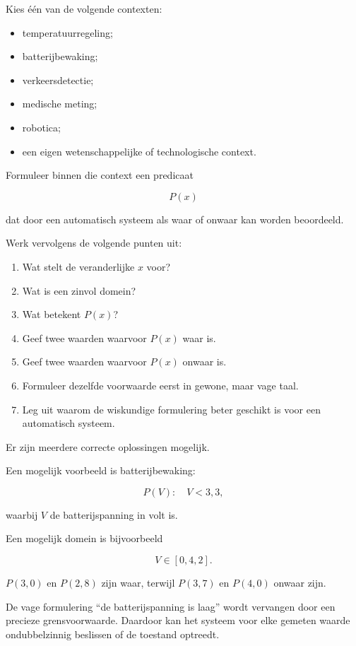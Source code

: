 \documentclass{ximera}
\begin{document}
\begin{oefening}{\oefG}

Kies één van de volgende contexten:

\begin{itemize}
  \item temperatuurregeling;
  \item batterijbewaking;
  \item verkeersdetectie;
  \item medische meting;
  \item robotica;
  \item een eigen wetenschappelijke of technologische context.
\end{itemize}

Formuleer binnen die context een predicaat

\[
P(x)
\]

dat door een automatisch systeem als waar of onwaar kan worden
beoordeeld.

Werk vervolgens de volgende punten uit:

\begin{enumerate}
  \item Wat stelt de veranderlijke $x$ voor?
  \item Wat is een zinvol domein?
  \item Wat betekent $P(x)$?
  \item Geef twee waarden waarvoor $P(x)$ waar is.
  \item Geef twee waarden waarvoor $P(x)$ onwaar is.
  \item Formuleer dezelfde voorwaarde eerst in gewone, maar vage taal.
  \item Leg uit waarom de wiskundige formulering beter geschikt is voor
        een automatisch systeem.
\end{enumerate}

\begin{oplossing}
Er zijn meerdere correcte oplossingen mogelijk.

Een mogelijk voorbeeld is batterijbewaking:

\[
P(V):\quad V<3{,}3,
\]

waarbij $V$ de batterijspanning in volt is.

Een mogelijk domein is bijvoorbeeld

\[
V\in[0,4{,}2].
\]

$P(3{,}0)$ en $P(2{,}8)$ zijn waar, terwijl $P(3{,}7)$ en $P(4{,}0)$
onwaar zijn.

De vage formulering ``de batterijspanning is laag'' wordt vervangen
door een precieze grensvoorwaarde. Daardoor kan het systeem voor elke
gemeten waarde ondubbelzinnig beslissen of de toestand optreedt.
\end{oplossing}

\end{oefening}
\end{document}
